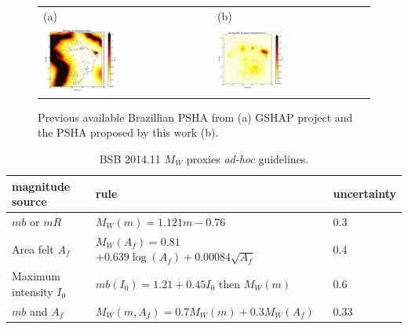 \documentclass[grl]{agutex}
\begin{document}
\begin{figure}
	\begin{center}
	\begin{table}[H]
		\begin{tabular}{ p{} p{} }
		\footnotesize(a)
		&
		\footnotesize(b)
		\\
		\includegraphics[width=0.45\textwidth]{z_img_pga_gshap} &
		\includegraphics[width=0.45\textwidth]{z_img_pga_helmstetter}
		\end{tabular}
	\end{table}
	\caption{Previous available Brazillian PSHA from (a) GSHAP project and the PSHA proposed by this work (b). }
	\label{placeholder}
	\end{center}
\end{figure}



\begin{table}[H]
	\caption{BSB 2014.11 $M_W$ proxies \emph{ad-hoc} guidelines.}
	\begin{tabular}{l l l}
		\hline
		\textbf{magnitude source} & \textbf{rule} & \textbf{uncertainty}\\
		\hline
		$mb$ or $mR$
		&$ M_W(m) = 1.121 m - 0.76 $
		& 0.3 \\
		Area felt $A_f$
		&$ M_W(A_f) = 0.81 $$    + 0.639\log(A_f) + 0.00084\sqrt{A_f}$& 0.4 \\
		Maximum intensity $I_0$
		& $mb(I_0) = 1.21 + 0.45 I_0$ then $M_W(m)$
		& 0.6 \\
		$mb$ and $A_f$
		& $M_W(m, A_f) = 0.7 M_W(m) + 0.3 M_W(A_f)$
		& 0.33 \\
		\hline
	\end{tabular}
	\label{tab:guidelines}
\end{table}
\end{document}
